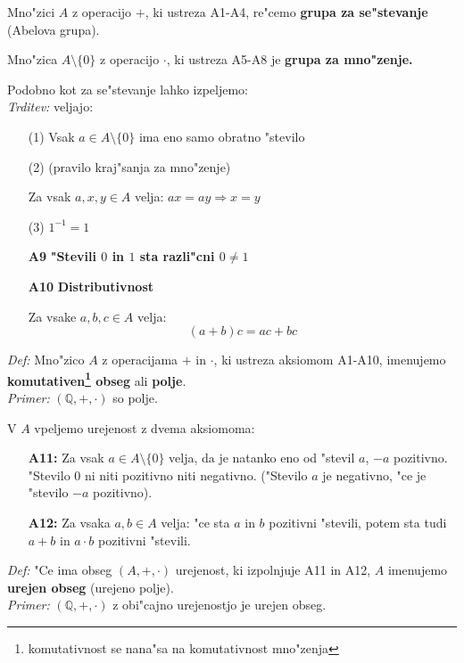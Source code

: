 Mno"zici \(A\) z operacijo \(+\), ki ustreza A1-A4, re"cemo \textbf{grupa za se"stevanje} (Abelova grupa).

Mno"zica \(A \setminus \{0\}\) z operacijo \(\cdot\), ki ustreza A5-A8 je \textbf{grupa za mno"zenje.}

Podobno kot za se"stevanje lahko izpeljemo:\\
\emph{Trditev:} veljajo:
\begin{itemize}
	\item[(1)] Vsak \(a \in A \setminus \{0\}\) ima eno samo obratno "stevilo
	\item[(2)] (pravilo kraj"sanja za mno"zenje)

	Za vsak \(a, x, y \in A\) velja: \(ax = ay \Rightarrow x = y\)
	\item[(3)] \(1^{-1} = 1\)
\end{itemize}

\begin{itemize}
	\item[\textbf{A9}] \textbf{"Stevili \(0\) in \(1\) sta razli"cni \(0 \neq 1\)}
	\item[\textbf{A10}] \textbf{Distributivnost}
	
	Za vsake \(a, b, c \in A\) velja:
	\[(a + b)c = ac + bc\]
\end{itemize}

\emph{Def:} Mno"zico \(A\) z operacijama \(+\) in \(\cdot\), ki ustreza aksiomom A1-A10, imenujemo \textbf{komutativen\footnote{komutativnost se nana"sa na komutativnost mno"zenja} obseg} ali \textbf{polje}.\\
\emph{Primer:} \((\mathbb{Q}, +, \cdot)\) so polje.

V \(A\) vpeljemo urejenost z dvema aksiomoma:
\begin{itemize}
	\item[\textbf{A11:}] Za  vsak \(a \in A \setminus \{0\}\) velja, da je natanko eno od "stevil \(a\), \(-a\) pozitivno. "Stevilo \(0\) ni niti pozitivno niti negativno. ("Stevilo \(a\) je negativno, "ce je "stevilo \(-a\) pozitivno).
	\item[\textbf{A12:}] Za vsaka \(a, b \in A\) velja: "ce sta \(a\) in \(b\) pozitivni "stevili, potem sta tudi \(a + b\) in \(a \cdot b\) pozitivni "stevili.
\end{itemize}

\emph{Def:} "Ce ima obseg \((A, +, \cdot)\) urejenost, ki izpolnjuje A11 in A12, \(A\) imenujemo \textbf{urejen obseg} (urejeno polje).\\
\emph{Primer:} \((\mathbb{Q}, +, \cdot)\) z obi"cajno urejenostjo je urejen obseg.

